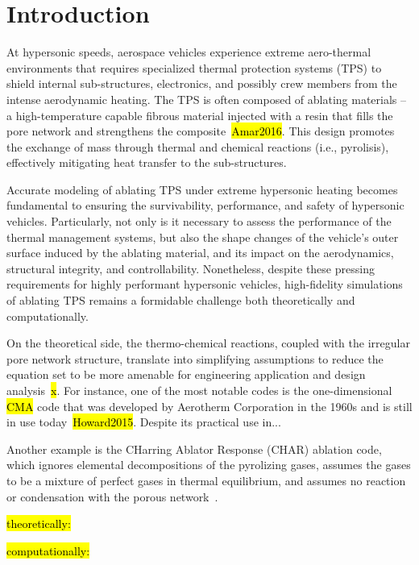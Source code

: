 \section{Introduction}

At hypersonic speeds, aerospace vehicles experience extreme aero-thermal environments that requires specialized thermal protection systems (TPS) to shield internal sub-structures, electronics, and possibly crew members from the intense aerodynamic heating. The TPS is often composed of ablating materials -- a high-temperature capable fibrous material injected with a resin that fills the pore network and strengthens the composite~\hl{Amar2016}. This design promotes the exchange of mass through thermal and chemical reactions (i.e., pyrolisis), effectively mitigating heat transfer to the sub-structures.

Accurate modeling of ablating TPS under extreme hypersonic heating becomes fundamental to ensuring the survivability, performance, and safety of hypersonic vehicles. Particularly, not only is it necessary to assess the performance of the thermal management systems, but also the shape changes of the vehicle's outer surface induced by the ablating material, and its impact on the aerodynamics, structural integrity, and controllability. Nonetheless, despite these pressing requirements for highly performant hypersonic vehicles, high-fidelity simulations of ablating TPS remains a formidable challenge both theoretically and computationally.

On the theoretical side, the thermo-chemical reactions, coupled with the irregular pore network structure, translate into simplifying assumptions to reduce the equation set to be more amenable for engineering application and design analysis~\hl{x}. For instance, one of the most notable codes is the one-dimensional \hl{CMA} code that was developed by Aerotherm Corporation in the 1960s and is still in use today~\hl{Howard2015}. Despite its practical use in...

Another example is the CHarring Ablator Response (CHAR) ablation code, which ignores elemental decompositions of the pyrolizing gases, assumes the gases to be a mixture of perfect gases in thermal equilibrium, and assumes no reaction or condensation with the porous network~\cite{Amar2016}.



\hl{theoretically:}

\hl{computationally:}

